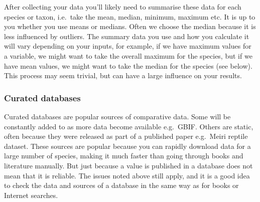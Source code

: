 \documentclass[]{book}
\begin{document}
After collecting your data you'll likely need to summarise these data
for each species or taxon, i.e.~take the mean, median, minimum, maximum
etc. It is up to you whether you use means or medians. Often we choose
the median because it is less influenced by outliers. The summary data
you use and how you calculate it will vary depending on your inputs, for
example, if we have maximum values for a variable, we might want to take
the overall maximum for the species, but if we have mean values, we
might want to take the median for the species (see below). This process
may seem trivial, but can have a large influence on your results.

\subsubsection{Curated databases}\label{curated-databases}

Curated databases are popular sources of comparative data. Some will be
constantly added to as more data become available e.g.~GBIF. Others are
static, often because they were released as part of a published paper
e.g.~Meiri reptile dataset. These sources are popular because you can
rapidly download data for a large number of species, making it much
faster than going through books and literature manually. But just
because a value is published in a database does not mean that it is
reliable. The issues noted above still apply, and it is a good idea to
check the data and sources of a database in the same way as for books or
Internet searches.
\end{document}
